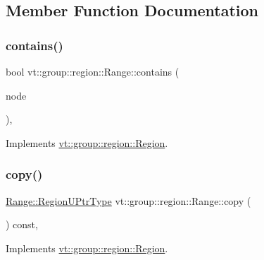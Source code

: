 \subsection{Member Function Documentation}
\mbox{\label{structvt_1_1group_1_1region_1_1_range_a1e8b87b37b06d3803fd3b287fde3564b}} 
\subsubsection{\texorpdfstring{contains()}{contains()}}
{\footnotesize\ttfamily bool vt\+::group\+::region\+::\+Range\+::contains (\begin{DoxyParamCaption}\item[{\hyperlink{namespacevt_a866da9d0efc19c0a1ce79e9e492f47e2}{Node\+Type} const \&}]{node }\end{DoxyParamCaption})\hspace{0.3cm}{\ttfamily [override]}, {\ttfamily [virtual]}}



Implements \hyperlink{structvt_1_1group_1_1region_1_1_region_a1e0ebd7367476fb397faf06a03b5583c}{vt\+::group\+::region\+::\+Region}.

\mbox{\label{structvt_1_1group_1_1region_1_1_range_a9b7985ec60471524e11bb933fd0f6821}} 
\subsubsection{\texorpdfstring{copy()}{copy()}}
{\footnotesize\ttfamily \hyperlink{structvt_1_1group_1_1region_1_1_region_ae5f42cf159116a3cf8bd65423eb01037}{Range\+::\+Region\+U\+Ptr\+Type} vt\+::group\+::region\+::\+Range\+::copy (\begin{DoxyParamCaption}{ }\end{DoxyParamCaption}) const\hspace{0.3cm}{\ttfamily [override]}, {\ttfamily [virtual]}}



Implements \hyperlink{structvt_1_1group_1_1region_1_1_region_a040d20a4f8c6fa351d7fe1cbfcae3a03}{vt\+::group\+::region\+::\+Region}.

